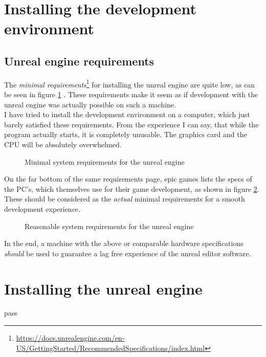 \section{Installing the development environment}

\subsection{Unreal engine requirements}

The \textit{minimal requirements}\footnote{\url{https://docs.unrealengine.com/en-US/GettingStarted/RecommendedSpecifications/index.html}} for installing the unreal engine are quite low, as can be seen in figure \ref{fig:unrealminspecs} \cite{UnrealEngineSpecs}. These requirements make it seem as if development with the unreal engine was actually possible on such a machine.\\
I have tried to install the development environment on a computer, which just barely satisfied these requirements. From the experience I can say, that while the program actually starts, it is completely unusable. The graphics card and the CPU will be absolutely overwhelmed.

\setlength{\fboxsep}{0pt}
\setlength{\fboxrule}{0pt}
\begin{figure}[h]
\centering
{}
\caption[Minimal system requirements unreal engine]{Minimal system requirements for the unreal engine}
\label{fig:unrealminspecs}
\end{figure}

On the far bottom of the same requirements page, epic games lists the specs of the PC's, which themselves use for their game development, as shown in figure \ref{fig:unrealgoodspecs}.\\
These should be considered as the \textit{actual} minimal requirements for a smooth development experience.

\setlength{\fboxsep}{0pt}
\setlength{\fboxrule}{0pt}
\begin{figure}[h]
\centering
{}
\caption[Reasonable system requirements unreal engine]{Reasonable system requirements for the unreal engine}
\label{fig:unrealgoodspecs}
\end{figure}

In the end, a machine with the above or comparable hardware specifications \textit{should} be used to guarantee a lag free experience of the unreal editor software.

\section{Installing the unreal engine}

pass